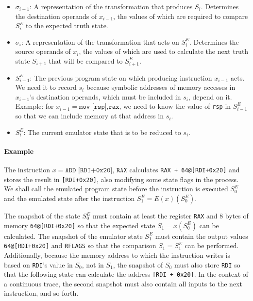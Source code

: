 \begin{itemize}
    \item $\sigma_{i-1}$: A representation of the transformation that produces $S_i$. Determines the destination
        operands of $x_{i-1}$, the values of which are required to compare $S^E_i$ to the expected truth state.
    \item $\sigma_i$: A representation of the transformation that acts on $S^E_i$. Determines the source operands of
        $x_i$, the values of which are used to calculate the next truth state $S_{i+1}$ that will be compared to
        $S^E_{i+1}$.
    \item $S^E_{i-1}$: The previous program state on which producing instruction $x_{i-1}$ acts. We need it to record
        $s_i$ because symbolic addresses of memory accesses in $x_{i-1}$'s destination operands, which must be included
        in $s_i$, depend on it. Example: for $x_{i-1} = \texttt{mov [rsp],rax}$, we need to know the value of
        \texttt{rsp} in $S^E_{i-1}$ so that we can include memory at that address in $s_i$.
    \item $S^E_i$: The current emulator state that is to be reduced to $s_i$.
\end{itemize}

\paragraph{Example} The instruction $x = \texttt{ADD [RDI+0x20], RAX}$ calculates \texttt{RAX + 64@[RDI+0x20]} and
stores the result in \texttt{[RDI+0x20]}, also modifying some state flags in the process. We shall call the emulated
program state before the instruction is executed $S^E_0$ and the emulated state after the instruction $S^E_1 =
E(x)(S^E_0)$.

The snapshot of the state $S^E_0$ must contain at least the register \texttt{RAX} and 8 bytes of memory
\texttt{64@[RDI+0x20]} so that the expected state $S_1 = x(S^E_0)$ can be calculated. The snapshot of the emulator state
$S^E_1$ must contain the output values \texttt{64@[RDI+0x20]} and \texttt{RFLAGS} so that the comparison $S_1 = S^E_1$
can be performed. Additionally, because the memory address to which the instruction writes is based on \texttt{RDI}'s
value in $S_0$, not in $S_1$, the snapshot of $S_0$ must also store \texttt{RDI} so that the following state can
calculate the address \texttt{[RDI + 0x20]}. In the context of a continuous trace, the second snapshot must also contain
all inputs to the next instruction, and so forth.
\\

